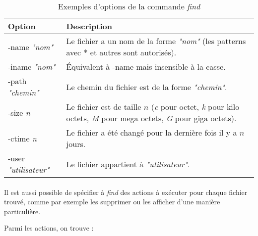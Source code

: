 \begin{table}[h]
    \centering
    \begin{tabular}{|l|p{10cm}|}
        \hline
        \textbf{Option}              & \textbf{Description}\\
        \hline
        -name \textit{"nom"}         & Le fichier a un nom de la forme
                                       \textit{"nom"} (les patterns avec * et
                                       autres sont autorisés).\\
        \hline
        -iname \textit{"nom"}        & Équivalent à -name mais insensible à la
                                       casse.\\
        \hline
        -path \textit{"chemin"}      & Le chemin du fichier est de la forme
                                       \textit{"chemin"}.\\
        \hline
        -size \textit{n}             & Le fichier est de taille $n$
                                       (\textit{c} pour octet, \textit{k} pour
                                       kilo octets, \textit{M} pour mega
                                       octets, \textit{G} pour giga octets).\\
        \hline
        -ctime \textit{n}            & Le fichier a été changé pour la dernière
                                       fois il y a $n$ jours. \\
        \hline
        -user \textit{"utilisateur"} & Le fichier appartient à
                                       \textit{"utilisateur"}.\\
        \hline
    \end{tabular}
    \caption{Exemples d'options de la commande \emph{find}}
    \label{tab:find-opts}
\end{table}

\paragraph{}
Il est aussi possible de spécifier à \emph{find} des actions à exécuter pour
chaque fichier trouvé, comme par exemple les supprimer ou les afficher d'une
manière particulière.

Parmi les actions, on trouve :


